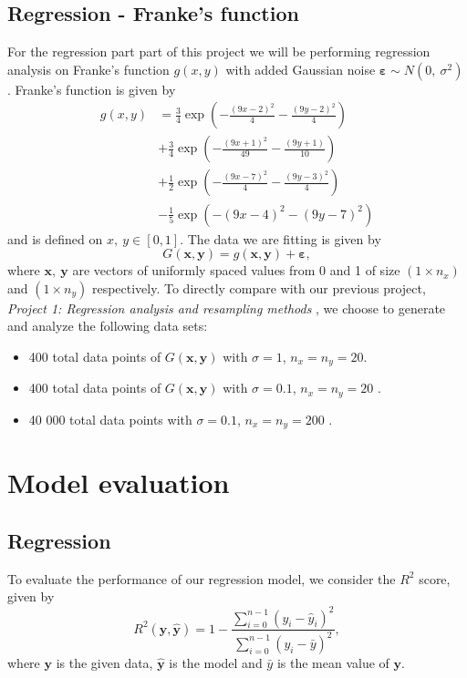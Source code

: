 \documentclass[a4paper, 11pt, twocolumn]{article}
\begin{document}
\subsection{Regression - Franke's function}
For the regression part part of this project we will be performing regression analysis on Franke's function $g(x,y)$ with added Gaussian noise $\bm{\varepsilon} \sim N(0,\  \sigma^2) $. Franke's function is given by 
\begin{align}
g(x,y) &= \frac{3}{4}\exp{\left(-\frac{(9x-2)^2}{4}   - \frac{(9y-2)^2}{4}\right)} \nonumber\\
 &+\frac{3}{4}\exp{\left(-\frac{(9x+1)^2}{49}- \frac{(9y+1)}{10}\right)} \nonumber\\
 &+\frac{1}{2}\exp{\left(-\frac{(9x-7)^2}{4} - \frac{(9y-3)^2}{4}\right)} \nonumber\\
 &-\frac{1}{5}\exp{\left(-(9x-4)^2 - (9y-7)^2\right) }  \label{eq:Franke}
\end{align} and is defined on $x,\ y \in [0,1]$. The data we are fitting is given by 
$$G(\bm{x}, \bm{y}) = g(\bm{x}, \bm{y}) + \bm{\varepsilon},$$
where $\bm{x},\ \bm{y}$ are vectors of uniformly spaced values from 0 and 1 of size $(1\times n_x)$ and $(1\times n_y)$ respectively. To directly compare with our previous project, \textit{Project 1: Regression analysis and resampling methods} \cite{regpaper}, we choose to generate and analyze the following data sets: 
\begin{itemize}[leftmargin=7mm, itemsep=5pt,  parsep=1pt, topsep=3pt]
\item 400 total data points of $G(\bm{x}, \bm{y}) $ with $\sigma=1$, $n_x=n_y=20$.
\item 400 total data points of $G(\bm{x}, \bm{y}) $ with $\sigma=0.1$, $n_x=n_y=20$ .
\item 40 000 total data points with $\sigma=0.1$, $n_x=n_y=200$ .
\end{itemize}  

\section{Model evaluation}
\subsection{Regression}
To evaluate the performance of our regression model, we consider the $R^2$ score, given by 
\begin{equation}
    R^2(\bm{y}, \bm{\hat{y}}) = 1 - \frac{\sum_{i=0}^{n - 1} (y_i - \hat{y}_i)^2}{\sum_{i=0}^{n - 1} (y_i - \bar{y})^2},
    \label{eq:R2}
\end{equation}
where $\bm{y}$ is the given data, $\bm{\hat{y}}$ is the model and ${\bar{y}}$ is the mean value of $\bm{y}$.
\end{document}
